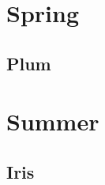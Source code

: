 \documentclass[11pt,a4paper]{report}
\providecommand\KachoFrameCmd{}
\begin{document}
\KachoFrameCmd
\tableofcontents
\chapter{Spring}
\lipsum[1-3]
\section{Plum}
\lipsum[4-5]
\chapter{Summer}
\lipsum[6-8]
\section{Iris}
\lipsum[9]
\end{document}
